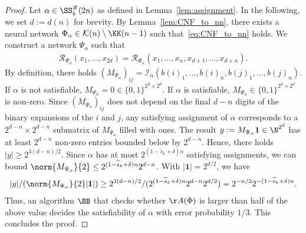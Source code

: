 \documentclass{amsart}[11pt]
\numberwithin{equation}{section}
\newcommand{\realization}{\mathcal{R}}
\newcommand{\interpretation}{\mathcal{I}}
\numberwithin{theorem}{section}
\begin{document}
    \begin{proof}
        Let $\alpha\in \SS_k^\#(2n)$ as defined in Lemma~\ref{lem:assignment}. In the following, we set $d:=d(n)$ for brevity.
        By Lemma~\ref{lem:CNF_to_nn}, there exists a neural network $\Phi_\alpha \in \mathcal{K}(n) \setminus  \KK(n - 1)$ such that~\eqref{eq:CNF_to_nn} holds. We construct a network $\Psi_\alpha$ such that
        \begin{align*}
        \realization_{\Psi_\alpha}(x_1,\ldots,x_{2d}) = \realization_{\Phi_\alpha}(x_1,\ldots,x_n,x_{d+1},\ldots,x_{d+n}).
        \end{align*} 
        By definition, there holds $(M_{\Psi_\alpha})_{ij} = \interpretation_\alpha(b(i)_1,\ldots,b(i)_n,b(j)_1,\ldots,b(j)_n)$.
        If $\alpha$ is not satisfiable, $M_{\Psi_\alpha}=0\in \{0,1\}^{2^{d}\times 2^{d}}$. If $\alpha$ is satisfiable,  $M_{\Psi_\alpha}\in\{0,1\}^{2^{d}\times 2^{d}}$ is non-zero.
        Since $(M_{\Psi_\alpha})_{ij}$ does not depend on the final $d-n$ digits of the binary expansions of the $i$ and $j$, any satisfying assignment of $\alpha$ corresponds to a $2^{d-n}\times 2^{d-n}$ submatrix of $M_{\Psi_\alpha}$ filled with ones. The result $y:=M_{\Psi_\alpha}\boldsymbol{1}\in \N^{2^d}$ has at least $2^{d-n}$ non-zero entries bounded below by $2^{d-n}$.
        Hence, there holds $|y|\geq   2^{3(d-n)/2}$.
        Since $\alpha$ has at most $2^{(1-\widetilde s_k+\delta)n}$ satisfying assignments, we can bound $\norm{M_{\Psi_\alpha}}{2}\leq 2^{(1-\widetilde s_k+\delta)n}2^{d-n}$. With $|\boldsymbol{1}|=2^{d/2}$, we have
        \begin{align*}
        |y|/(\norm{M_{\Psi_\alpha}}{2}|\boldsymbol{1}|) \geq 2^{3(d-n)/2}/(2^{(1-\widetilde s_k+\delta)n}2^{d-n}2^{d/2}) = 2^{-n/2}2^{-(1-\widetilde s_k+\delta)n}.
        \end{align*}
        Thus, an algorithm $\BB$ that checks whether $\AA(\Phi)$ is larger than half of the above value decides the satisfiability of $\alpha$ with error probability $1/3$. This concludes the proof.
    \end{proof}
    
\end{document}
